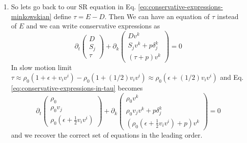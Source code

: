 \documentclass[10pt]{article}
\begin{document}
\begin{enumerate}
\item So lets go back to our SR equation in Eq. \eqref{eq:conservative-expressions-minkowskian} define $\tau = E - D$. Then We can have an equation of $\tau$ instead of $E$ and we can write conservative expressions as
  \begin{equation}
    \label{eq:conservative-expressions-in-tau}
    \partial_t
    \begin{pmatrix}
      D\\
      S_j\\
      \tau
    \end{pmatrix} + \partial_k
    \begin{pmatrix}
      D v^k\\
      S_jv^k + p \delta^k_j\\
      (\tau + p)v^k
    \end{pmatrix} = 0
  \end{equation}
  In slow motion limit $\tau \approx \rho_0(1 + \epsilon + v_i v^i) - \rho_0 (1 + (1/2)v_iv^i) \approx \rho_0(\epsilon + (1/2)v_i v^i)$ and Eq. \eqref{eq:conservative-expressions-in-tau} becomes
    \begin{equation}
    \label{eq:conservative-expressions-in-tau-slow-motion-limit}
    \boxed{\partial_t
    \begin{pmatrix}
      \rho_0\\
      \rho_0 v_j \\
      \rho_0(\epsilon + \frac{1}{2}v_i v^i)
    \end{pmatrix} + \partial_k
    \begin{pmatrix}
      \rho_0 v^k \\
      \rho_0 v_j v^k + p\delta^k_j\\
      (\rho_0(\epsilon + \frac{1}{2}v_i v^i) + p)v^k
    \end{pmatrix} = 0}
  \end{equation}
  and we recover the correct set of equations in the leading order.
\end{enumerate}
\end{document}
